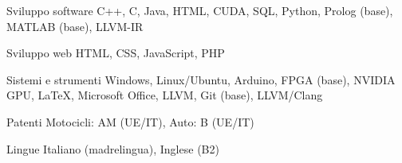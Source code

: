 
\begin{cvskills}

\cvskill
{Sviluppo software} %
{C++, C, Java, HTML, CUDA, SQL, Python, Prolog (base), MATLAB (base), LLVM-IR} %

\cvskill
{Sviluppo web} %
{HTML, CSS, JavaScript, PHP} %

\cvskill
{Sistemi e strumenti} %
{Windows, Linux/Ubuntu, Arduino, FPGA (base), NVIDIA GPU, LaTeX, Microsoft Office, LLVM, Git (base), LLVM/Clang} %

\cvskill
{Patenti} %
{Motocicli: AM (UE/IT), Auto: B (UE/IT)} %

\cvskill
{Lingue} %
{Italiano (madrelingua), Inglese (B2)} %

\end{cvskills}
